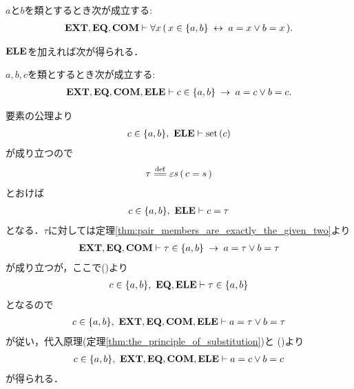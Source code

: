 	\begin{screen}
		\begin{thm}[対は表示されている要素しか持たない]
		\label{thm:pair_members_are_exactly_the_given_two}
			$a$と$b$を類とするとき次が成立する:
			\begin{align}
				\mbox{{\bf EXT}},\mbox{{\bf EQ}},\mbox{\bf COM} \vdash 
				\forall x\, (\, x \in \{a,b\} \hspace{0.25em}\leftrightarrow\hspace{0.25em} a = x \vee b = x\, ).
			\end{align}
		\end{thm}
	\end{screen}
	
	$\mbox{{\bf ELE}}$を加えれば次が得られる．
	
	\begin{screen}
		\begin{thm}[対の要素は表示されている要素の一方には等しい]
		\label{cor:pair_members_are_exactly_the_given_two}
			$a,b,c$を類とするとき次が成立する:
			\begin{align}
				\mbox{{\bf EXT}},\mbox{{\bf EQ}},\mbox{\bf COM},\mbox{{\bf ELE}} \vdash 
				c \in \{a,b\} \hspace{0.25em}\rightarrow\hspace{0.25em} a = c \vee b = c.
			\end{align}
		\end{thm}
	\end{screen}
	
	\begin{sketch}
		要素の公理より
		\begin{align}
			c \in \{a,b\},\ \mbox{{\bf ELE}} \vdash \operatorname*{set}\hspace{0.15em}(c)
		\end{align}
		が成り立つので
		\begin{align}
			\tau \defeq \varepsilon s\, (\, c = s\, )
		\end{align}
		とおけば
		\begin{align}
			c \in \{a,b\},\ \mbox{{\bf ELE}} \vdash c = \tau
			\label{fom:pair_members_are_exactly_the_given_two_2}
		\end{align}
		となる．$\tau$に対しては定理\ref{thm:pair_members_are_exactly_the_given_two}より 
		\begin{align}
			\mbox{{\bf EXT}},\mbox{{\bf EQ}},\mbox{\bf COM} \vdash 
			\tau \in \{a,b\} \hspace{0.25em}\rightarrow\hspace{0.25em} a = \tau \vee b = \tau
		\end{align}
		が成り立つが，ここで()より
		\begin{align}
			c \in \{a,b\},\ \mbox{{\bf EQ}},\mbox{{\bf ELE}} \vdash \tau \in \{a,b\}
		\end{align}
		となるので
		\begin{align}
			c \in \{a,b\},\ \mbox{{\bf EXT}},\mbox{{\bf EQ}},\mbox{\bf COM},\mbox{{\bf ELE}} \vdash a = \tau \vee b = \tau
		\end{align}
		が従い，代入原理(定理\ref{thm:the_principle_of_substitution})と
		()より
		\begin{align}
			c \in \{a,b\},\ \mbox{{\bf EXT}},\mbox{{\bf EQ}},\mbox{\bf COM},\mbox{{\bf ELE}} \vdash a = c \vee b = c
		\end{align}
		が得られる．
		\QED
	\end{sketch}
	
